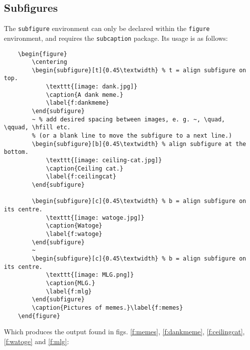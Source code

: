 \subsection{Subfigures}
%
The \verb|subfigure| environment can only be declared within the \verb|figure| environment, and requires the \verb|subcaption| package. Its usage is as follows:
\begin{verbatim}
	\begin{figure}
	    \centering
	    \begin{subfigure}[t]{0.45\textwidth} % t = align subfigure on top.
	        \texttt{[image: dank.jpg]}
	        \caption{A dank meme.}
	        \label{f:dankmeme}
	    \end{subfigure}
	    ~ % add desired spacing between images, e. g. ~, \quad, \qquad, \hfill etc.
	    % (or a blank line to move the subfigure to a next line.)
	    \begin{subfigure}[b]{0.45\textwidth} % align subfigure at the bottom.
	        \texttt{[image: ceiling-cat.jpg]}
	        \caption{Ceiling cat.}
	        \label{f:ceilingcat}
	    \end{subfigure}

	    \begin{subfigure}[c]{0.45\textwidth} % b = align subfigure on its centre.
	        \texttt{[image: watoge.jpg]}
	        \caption{Watoge}
	        \label{f:watoge}
	    \end{subfigure}
	    ~
	    \begin{subfigure}[c]{0.45\textwidth} % b = align subfigure on its centre.
	        \texttt{[image: MLG.png]}
	        \caption{MLG.}
	        \label{f:mlg}
	    \end{subfigure}
	    \caption{Pictures of memes.}\label{f:memes}
	\end{figure}
\end{verbatim}
Which produces the output found in figs. \ref{f:memes}, \ref{f:dankmeme}, \ref{f:ceilingcat}, \ref{f:watoge} and \ref{f:mlg}:
